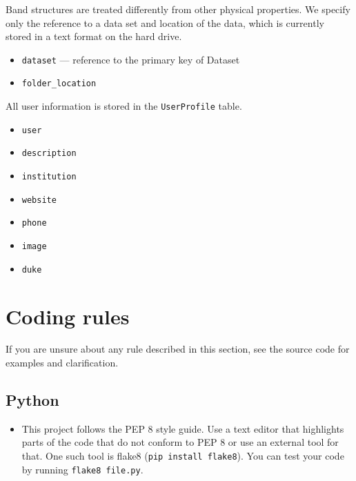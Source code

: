 \documentclass{article}
\begin{document}
Band structures are treated differently from other physical properties. We specify only the reference to a data set and location of the data, which is currently stored in a text format on the hard drive.
\begin{tcolorbox}[colback=green!5,colframe=green!40!black,title=BandStructure(Base)]
  \begin{itemize}
  \item \texttt{dataset} --- reference to the primary key of Dataset
  \item \texttt{folder\_location}
  \end{itemize}
\end{tcolorbox}

All user information is stored in the \texttt{UserProfile} table.
\begin{tcolorbox}[colback=green!5,colframe=green!40!black,title=UserProfile]
  \begin{itemize}
  \item \texttt{user}
  \item \texttt{description}
  \item \texttt{institution}
  \item \texttt{website}
  \item \texttt{phone}
  \item \texttt{image}
  \item \texttt{duke}
  \end{itemize}
\end{tcolorbox}

\section{Coding rules}

If you are unsure about any rule described in this section, see the source code for examples and clarification.

\subsection{Python}

\begin{itemize}
\item This project follows the PEP 8 style guide. Use a text editor that highlights parts of the code that do not conform to PEP 8 or use an external tool for that. One such tool is flake8 (\texttt{pip install flake8}). You can test your code by running \texttt{flake8 file.py}.
\end{itemize}
\end{document}
